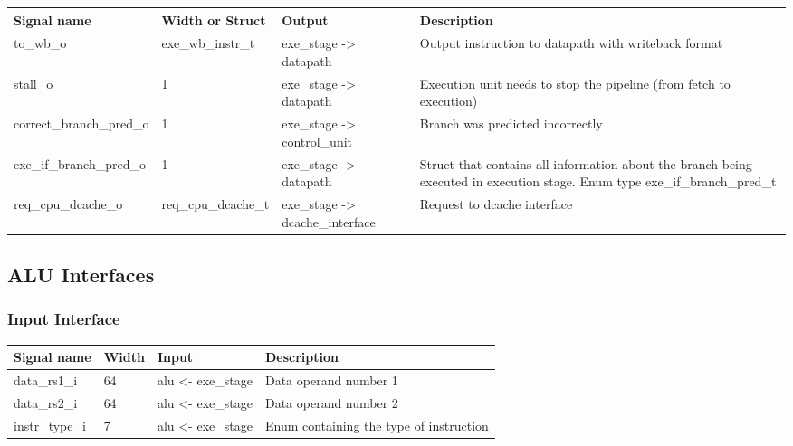 \begin{table}[H]
\centering
\begin{tabular}{l|p{3cm}|l|p{4cm}}
\hline
\hline
Signal name & Width or Struct & Output & Description \\
\hline
\hline
to\_wb\_o & exe\_wb\_instr\_t & exe\_stage -> datapath & Output instruction to datapath with writeback format\\
\hline
stall\_o & 1 & exe\_stage -> datapath & Execution unit needs to stop the pipeline (from fetch to execution)\\
\hline
correct\_branch\_pred\_o & 1 & exe\_stage -> control\_unit & Branch was predicted incorrectly\\
\hline
exe\_if\_branch\_pred\_o & 1 & exe\_stage -> datapath & Struct that contains all information about the branch being executed in execution stage. Enum type exe\_if\_branch\_pred\_t\\
\hline
req\_cpu\_dcache\_o & req\_cpu\_dcache\_t & exe\_stage -> dcache\_interface & Request to dcache interface \\
\hline
\hline
\end{tabular}
\end{table}


\subsection{ALU Interfaces}

\subsubsection{Input Interface}

\begin{table}[H]
\centering
\begin{tabular}{l|l|l|l}
\hline
\hline
Signal name & Width & Input & Description \\
\hline
\hline
data\_rs1\_i & 64 & alu <- exe\_stage & Data operand number 1 \\
\hline
data\_rs2\_i & 64 & alu <- exe\_stage & Data operand number 2 \\
\hline
instr\_type\_i & 7 & alu <- exe\_stage & Enum containing the type of instruction\\ \hline
\hline
\end{tabular}
\end{table}

